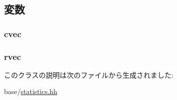 \subsection{変数}
\hypertarget{classStats_1_1VectorInfoProxy_a8cc2f3a565a2e54ab797f717802bc894}{
\subsubsection[{cvec}]{ {\bf cvec}}}
\label{classStats_1_1VectorInfoProxy_a8cc2f3a565a2e54ab797f717802bc894}
\hypertarget{classStats_1_1VectorInfoProxy_a39641e85a212191bbc9d5d6293522515}{
\subsubsection[{rvec}]{ {\bf rvec}}}
\label{classStats_1_1VectorInfoProxy_a39641e85a212191bbc9d5d6293522515}


このクラスの説明は次のファイルから生成されました:\begin{DoxyCompactItemize}
\item 
base/\hyperlink{statistics_8hh}{statistics.hh}\end{DoxyCompactItemize}
